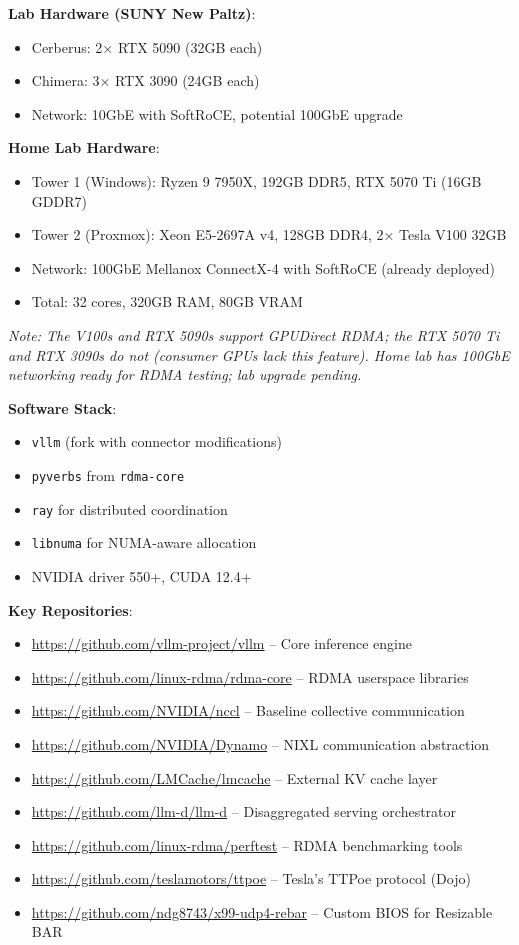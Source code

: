\documentclass[10pt,letterpaper]{article}
\begin{document}
\textbf{Lab Hardware (SUNY New Paltz)}:
\begin{itemize}[noitemsep]
    \item Cerberus: 2$\times$ RTX 5090 (32GB each)
    \item Chimera: 3$\times$ RTX 3090 (24GB each)
    \item Network: 10GbE with SoftRoCE, potential 100GbE upgrade
\end{itemize}

\textbf{Home Lab Hardware}:
\begin{itemize}[noitemsep]
    \item Tower 1 (Windows): Ryzen 9 7950X, 192GB DDR5, RTX 5070 Ti (16GB GDDR7)
    \item Tower 2 (Proxmox): Xeon E5-2697A v4, 128GB DDR4, 2$\times$ Tesla V100 32GB
    \item Network: 100GbE Mellanox ConnectX-4 with SoftRoCE (already deployed)
    \item Total: 32 cores, 320GB RAM, 80GB VRAM
\end{itemize}

\textit{Note: The V100s and RTX 5090s support GPUDirect RDMA; the RTX 5070 Ti and RTX 3090s do not (consumer GPUs lack this feature). Home lab has 100GbE networking ready for RDMA testing; lab upgrade pending.}

\textbf{Software Stack}:
\begin{itemize}[noitemsep]
    \item \texttt{vllm} (fork with connector modifications)
    \item \texttt{pyverbs} from \texttt{rdma-core}
    \item \texttt{ray} for distributed coordination
    \item \texttt{libnuma} for NUMA-aware allocation
    \item NVIDIA driver 550+, CUDA 12.4+
\end{itemize}

\textbf{Key Repositories}:
\begin{itemize}[noitemsep]
    \item \url{https://github.com/vllm-project/vllm} -- Core inference engine
    \item \url{https://github.com/linux-rdma/rdma-core} -- RDMA userspace libraries
    \item \url{https://github.com/NVIDIA/nccl} -- Baseline collective communication
    \item \url{https://github.com/NVIDIA/Dynamo} -- NIXL communication abstraction
    \item \url{https://github.com/LMCache/lmcache} -- External KV cache layer
    \item \url{https://github.com/llm-d/llm-d} -- Disaggregated serving orchestrator
    \item \url{https://github.com/linux-rdma/perftest} -- RDMA benchmarking tools
    \item \url{https://github.com/teslamotors/ttpoe} -- Tesla's TTPoe protocol (Dojo)
    \item \url{https://github.com/ndg8743/x99-udp4-rebar} -- Custom BIOS for Resizable BAR
\end{itemize}
\end{document}
